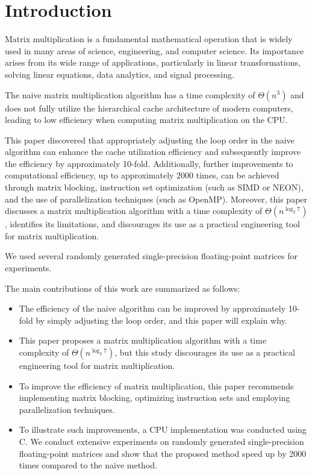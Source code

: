 \documentclass[conference]{IEEEtran}
\begin{document}
	\section{Introduction}
	Matrix multiplication is a fundamental mathematical operation that is widely used in many areas of science, engineering, and computer science. Its importance arises from its wide range of applications, particularly in linear transformations, solving linear equations, data analytics, and signal processing. 
	
	The naive matrix multiplication algorithm has a time complexity of $\Theta(n^3)$ and does not fully utilize the hierarchical cache architecture of modern computers, leading to low efficiency when computing matrix multiplication on the CPU.
	
	This paper discovered that appropriately adjusting the loop order in the naive algorithm can enhance the cache utilization efficiency and subsequently improve the efficiency by approximately 10-fold. Additionally, further improvements to computational efficiency, up to approximately 2000 times, can be achieved through matrix blocking, instruction set optimization (such as SIMD or NEON), and the use of parallelization techniques (such as OpenMP). Moreover, this paper discusses a matrix multiplication algorithm with a time complexity of $\Theta(n^{\log_2 7})$, identifies its limitations, and discourages its use as a practical engineering tool for matrix multiplication.
	
	We used several randomly generated single-precision floating-point matrices for experiments.
	
	The main contributions of this work are summarized as follows:
	
	\begin{itemize}
		\item The efficiency of the naive algorithm can be improved by approximately 10-fold by simply adjusting the loop order, and this paper will explain why.
		\item This paper proposes a matrix multiplication algorithm with a time complexity of $\Theta(n^{\log_2 7})$, but this study discourages its use as a practical engineering tool for matrix multiplication.
		\item To improve the efficiency of matrix multiplication, this paper recommends implementing matrix blocking, optimizing instruction sets and employing parallelization techniques.
		\item  To illustrate such improvements, a CPU implementation was conducted using C. We conduct extensive experiments on randomly generated single-precision floating-point matrices and show that the proposed method speed up by 2000 times compared to the naive method.
	\end{itemize}
\end{document}
